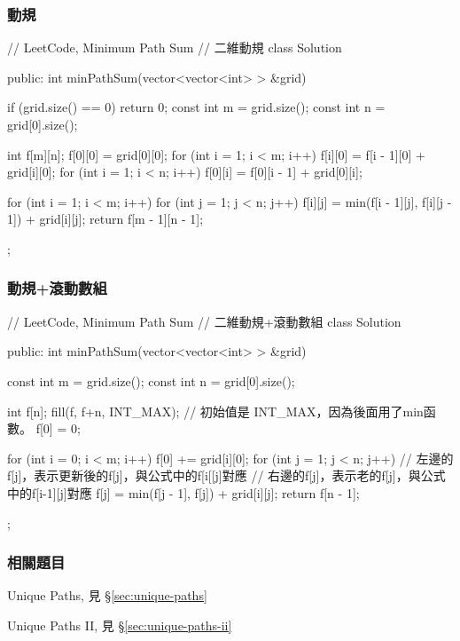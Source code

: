 \subsubsection{動規}
\begin{Code}
// LeetCode, Minimum Path Sum
// 二維動規
class Solution {
public:
    int minPathSum(vector<vector<int> > &grid) {
        if (grid.size() == 0) return 0;
        const int m = grid.size();
        const int n = grid[0].size();

        int f[m][n];
        f[0][0] = grid[0][0];
        for (int i = 1; i < m; i++) {
            f[i][0] = f[i - 1][0] + grid[i][0];
        }
        for (int i = 1; i < n; i++) {
            f[0][i] = f[0][i - 1] + grid[0][i];
        }

        for (int i = 1; i < m; i++) {
            for (int j = 1; j < n; j++) {
                f[i][j] = min(f[i - 1][j], f[i][j - 1]) + grid[i][j];
            }
        }
        return f[m - 1][n - 1];
    }
};
\end{Code}


\subsubsection{動規+滾動數組}
\begin{Code}
// LeetCode, Minimum Path Sum
// 二維動規+滾動數組
class Solution {
public:
    int minPathSum(vector<vector<int> > &grid) {
        const int m = grid.size();
        const int n = grid[0].size();

        int f[n];
        fill(f, f+n, INT_MAX); // 初始值是 INT_MAX，因為後面用了min函數。
        f[0] = 0;

        for (int i = 0; i < m; i++) {
            f[0] += grid[i][0];
            for (int j = 1; j < n; j++) {
                // 左邊的f[j]，表示更新後的f[j]，與公式中的f[i[[j]對應
                // 右邊的f[j]，表示老的f[j]，與公式中的f[i-1][j]對應
                f[j] = min(f[j - 1], f[j]) + grid[i][j];
            }
        }
        return f[n - 1];
    }
};
\end{Code}

\subsubsection{相關題目}
\begindot
\item Unique Paths, 見 \S \ref{sec:unique-paths}
\item Unique Paths II, 見 \S \ref{sec:unique-paths-ii}
\myenddot


